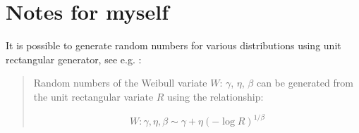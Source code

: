 \section{Notes for myself}

It is possible to generate random numbers
for various distributions using unit rectangular
generator, see e.g. \cite[][p.196,197]{evans2000}:

\begin{quote}
Random numbers of the Weibull variate $W$: $\gamma$,
$\eta$, $\beta$ can be generated from the unit rectangular
variate $R$ using the relationship:

\begin{displaymath}
W: \gamma, \eta, \beta \sim \gamma + 
 \eta
  \left(
   - \log R
  \right)
          ^ {1/\beta}
\end{displaymath}

\end{quote}
